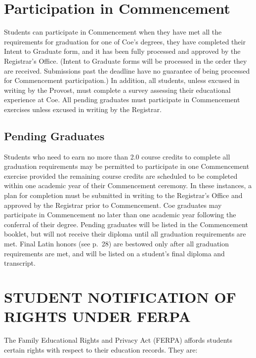 \documentclass[
  letterpaper,
]{scrbook}
\begin{document}
\section{Participation in
Commencement}\label{participation-in-commencement}

Students can participate in Commencement when they have met all the
requirements for graduation for one of Coe's degrees, they have
completed their Intent to Graduate form, and it has been fully processed
and approved by the Registrar's Office. (Intent to Graduate forms will
be processed in the order they are received. Submissions past the
deadline have no guarantee of being processed for Commencement
participation.) In addition, all students, unless excused in writing by
the Provost, must complete a survey assessing their educational
experience at Coe. All pending graduates must participate in
Commencement exercises unless excused in writing by the Registrar.

\subsection{Pending Graduates}\label{pending-graduates}

Students who need to earn no more than 2.0 course credits to complete
all graduation requirements may be permitted to participate in one
Commencement exercise provided the remaining course credits are
scheduled to be completed within one academic year of their Commencement
ceremony. In these instances, a plan for completion must be submitted in
writing to the Registrar's Office and approved by the Registrar prior to
Commencement. Coe graduates may participate in Commencement no later
than one academic year following the conferral of their degree. Pending
graduates will be listed in the Commencement booklet, but will not
receive their diploma until all graduation requirements are met. Final
Latin honors (see p.~28) are bestowed only after all graduation
requirements are met, and will be listed on a student's final diploma
and transcript.

\section{STUDENT NOTIFICATION OF RIGHTS UNDER
FERPA}\label{student-notification-of-rights-under-ferpa}

The Family Educational Rights and Privacy Act (FERPA) affords students
certain rights with respect to their education records. They are:
\end{document}
